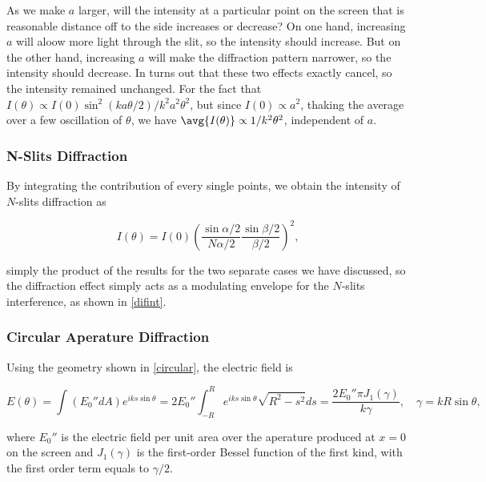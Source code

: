 \documentclass[english,a4paper,12pt]{report}
\begin{document}
{As we make \(a\) larger, will the intensity at a particular point on the screen that is reasonable distance off to the side increases or decrease?}
{On one hand, increasing \(a\) will aloow more light through the slit, so the intensity should increase. But on the other hand, increasing \(a\) will make the diffraction pattern narrower, so the intensity should decrease. In turns out that these two effects exactly cancel, so the intensity remained unchanged. For the fact that \(I(\theta) \propto I(0)\sin ^2(ka \theta /2) /k^2a^2\theta ^2 \), but since \(I(0)\propto a^2\), thaking the average over a few oscillation of \(\theta \), we have \(\avg{I(\theta )} \propto 1 /k^2\theta ^2 \), independent of \(a\).    } 

\subsubsection{N-Slits Diffraction}

By integrating the contribution of every single points, we obtain the intensity of \(N\)-slits diffraction as 

\begin{equation}
    I(\theta ) = I(0) \left( \frac{\sin \alpha  /2}{N\alpha  /2} \frac{\sin \beta /2}{\beta /2}   \right)^2,
\end{equation}

simply the product of the results for the two separate cases we have discussed, so the diffraction effect simply acts as a modulating envelope for the \(N\)-slits interference, as shown in \cref{difint}.


\subsubsection{Circular Aperature Diffraction}

Using the geometry shown in \cref{circular}, the electric field is 

\begin{equation}
    E(\theta ) = \int_{}^{} (E_0 ''dA) e^{iks \sin \theta } = 2E_0 '' \int_{-R}^{R} e^{iks \sin \theta }\sqrt{R^2-s ^2}ds = \frac{2E_0 ''\pi J_1 (\gamma )}{k\gamma }, \quad \gamma = kR\sin \theta ,
\end{equation}

where \(E_0 ''\) is the electric field per unit area over the aperature produced at \(x = 0\) on the screen and \(J_1 (\gamma )\) is the first-order Bessel function of the first kind, with the first order term equals to \(\gamma /2\).  
\end{document}
